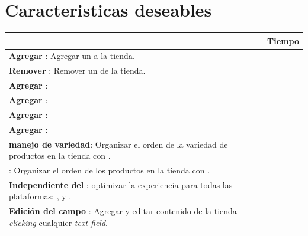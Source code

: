 \section{Caracteristicas deseables}\label{cap:intro:alcance}

\begin{table}[h!]
    \tiny
   
\begin{tabular}{ |L{0.6\paperwidth}|L{0.1\paperwidth}|}
\hline
	\task &
	Tiempo
	
\\ \hline
	\textbf{ Agregar \itemcommerce}: Agregar un \itemcommerce a la tienda.&
	
\\ \hline
	\textbf{ Remover \itemcommerce}: Remover un \itemcommerce de la tienda.&
	
\\ \hline
	\textbf{ Agregar \itemcommerce}: &
	
\\ \hline
	\textbf{ Agregar \itemcommerce}: &
	
\\ \hline
	\textbf{ Agregar \itemcommerce}: &
	
\\ \hline
	\textbf{ Agregar \itemcommerce}: &
	
\\ \hline
	\textbf{ \textit{\dragdrop} manejo de variedad}: Organizar el orden de la variedad de productos en la tienda con \textit{\dragdrop}.&
		
\\ \hline
	\textbf{ \dragdrop \merchandising}: Organizar el orden de los productos en la tienda con \textit{\dragdrop}.&
		
\\ \hline
	\textbf{Independiente del \device}: optimizar la experiencia para todas las plataformas: \mobile, \tablet y \desktop \devices.
		
\\ \hline
	 \textbf{Edición del campo \inline}: Agregar y editar contenido de la tienda \textit{clicking} cualquier \textit{text field}.&
		

\end{tabular}
\end{table}
